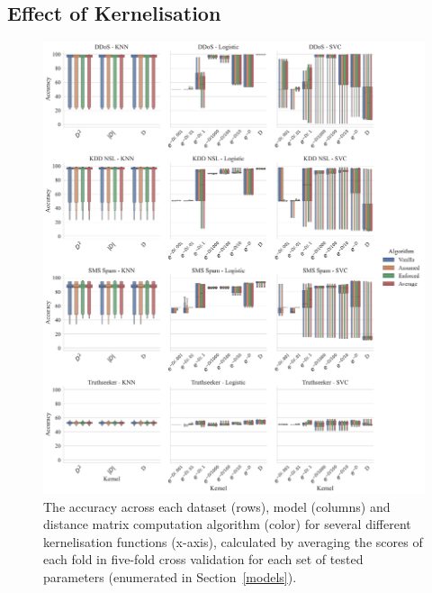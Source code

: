 \documentclass[conference]{IEEEtran}
\begin{document}
\subsection{Effect of Kernelisation}

\begin{figure}[htb]
    \centering
    \includegraphics[width=\textwidth]{images/accuracy_vs_kernel.pdf}
    \caption{The accuracy across each dataset (rows), model (columns) and distance matrix computation algorithm (color) for several different kernelisation functions (x-axis), calculated by averaging the scores of each fold in five-fold cross validation for each set of tested parameters (enumerated in Section~\ref{models}).}
    \label{fig:kernel_acc}
\end{figure}
\end{document}
